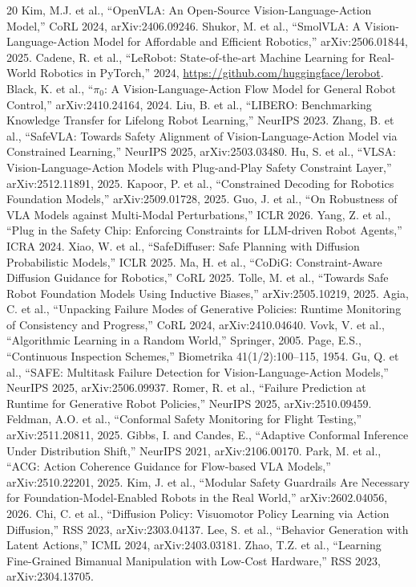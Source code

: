 \documentclass[conference]{IEEEtran}
\begin{document}
\begin{thebibliography}{20}
 Kim, M.J. et al., ``OpenVLA: An Open-Source Vision-Language-Action Model,'' CoRL 2024, arXiv:2406.09246.
 Shukor, M. et al., ``SmolVLA: A Vision-Language-Action Model for Affordable and Efficient Robotics,'' arXiv:2506.01844, 2025.
 Cadene, R. et al., ``LeRobot: State-of-the-art Machine Learning for Real-World Robotics in PyTorch,'' 2024, \url{https://github.com/huggingface/lerobot}.
 Black, K. et al., ``$\pi_0$: A Vision-Language-Action Flow Model for General Robot Control,'' arXiv:2410.24164, 2024.
 Liu, B. et al., ``LIBERO: Benchmarking Knowledge Transfer for Lifelong Robot Learning,'' NeurIPS 2023.
 Zhang, B. et al., ``SafeVLA: Towards Safety Alignment of Vision-Language-Action Model via Constrained Learning,'' NeurIPS 2025, arXiv:2503.03480.
 Hu, S. et al., ``VLSA: Vision-Language-Action Models with Plug-and-Play Safety Constraint Layer,'' arXiv:2512.11891, 2025.
 Kapoor, P. et al., ``Constrained Decoding for Robotics Foundation Models,'' arXiv:2509.01728, 2025.
 Guo, J. et al., ``On Robustness of VLA Models against Multi-Modal Perturbations,'' ICLR 2026.
 Yang, Z. et al., ``Plug in the Safety Chip: Enforcing Constraints for LLM-driven Robot Agents,'' ICRA 2024.
 Xiao, W. et al., ``SafeDiffuser: Safe Planning with Diffusion Probabilistic Models,'' ICLR 2025.
 Ma, H. et al., ``CoDiG: Constraint-Aware Diffusion Guidance for Robotics,'' CoRL 2025.
 Tolle, M. et al., ``Towards Safe Robot Foundation Models Using Inductive Biases,'' arXiv:2505.10219, 2025.
 Agia, C. et al., ``Unpacking Failure Modes of Generative Policies: Runtime Monitoring of Consistency and Progress,'' CoRL 2024, arXiv:2410.04640.
 Vovk, V. et al., ``Algorithmic Learning in a Random World,'' Springer, 2005.
 Page, E.S., ``Continuous Inspection Schemes,'' Biometrika 41(1/2):100--115, 1954.
 Gu, Q. et al., ``SAFE: Multitask Failure Detection for Vision-Language-Action Models,'' NeurIPS 2025, arXiv:2506.09937.
 Romer, R. et al., ``Failure Prediction at Runtime for Generative Robot Policies,'' NeurIPS 2025, arXiv:2510.09459.
 Feldman, A.O. et al., ``Conformal Safety Monitoring for Flight Testing,'' arXiv:2511.20811, 2025.
 Gibbs, I. and Candes, E., ``Adaptive Conformal Inference Under Distribution Shift,'' NeurIPS 2021, arXiv:2106.00170.
 Park, M. et al., ``ACG: Action Coherence Guidance for Flow-based VLA Models,'' arXiv:2510.22201, 2025.
 Kim, J. et al., ``Modular Safety Guardrails Are Necessary for Foundation-Model-Enabled Robots in the Real World,'' arXiv:2602.04056, 2026.
 Chi, C. et al., ``Diffusion Policy: Visuomotor Policy Learning via Action Diffusion,'' RSS 2023, arXiv:2303.04137.
 Lee, S. et al., ``Behavior Generation with Latent Actions,'' ICML 2024, arXiv:2403.03181.
 Zhao, T.Z. et al., ``Learning Fine-Grained Bimanual Manipulation with Low-Cost Hardware,'' RSS 2023, arXiv:2304.13705.
\end{thebibliography}
\end{document}
